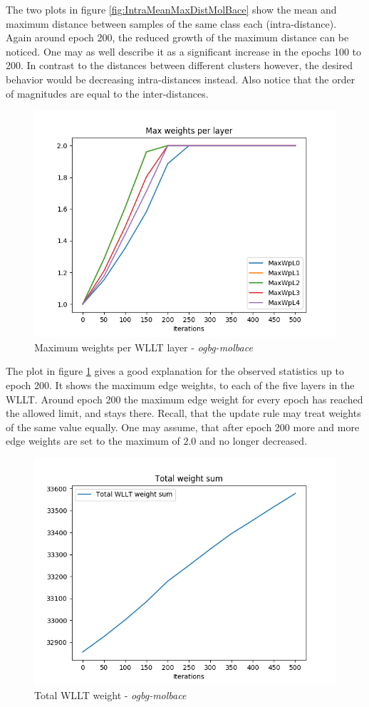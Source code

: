 		The two plots in figure \ref{fig:IntraMeanMaxDistMolBace} show the mean and maximum distance between samples of the same class each (intra-distance).
		Again around epoch 200, the reduced growth of the maximum distance can be noticed.
		One may as well describe it as a significant increase in the epochs 100 to 200.
		In contrast to the distances between different clusters however, the desired behavior would be decreasing intra-distances instead.
		Also notice that the order of magnitudes are equal to the inter-distances.
		
		\begin{figure}[H]
			\centering
			\includegraphics[width=0.7\linewidth]{images/plotA1_MaxWpL_ogbgMolbaceExp1}			
			\caption{Maximum weights per WLLT layer - \textit{ogbg-molbace}}
			\label{fig:plota1maxwplogbgmolbaceexp1}	
		\end{figure}
		
		The plot in figure \ref{fig:plota1maxwplogbgmolbaceexp1} gives a good explanation for the observed statistics up to epoch 200.
		It shows the maximum edge weights, to each of the five layers in the WLLT.
		Around epoch 200 the maximum edge weight for every epoch has reached the allowed limit, and stays there.
		Recall, that the update rule may treat weights of the same value equally.
		One may assume, that after epoch 200 more and more edge weights are set to the maximum of $2.0$ and no longer decreased.
		
		\begin{figure}[H]
			\centering
			\includegraphics[width=0.7\linewidth]{images/plotA1_TotalWeightSum_ogbgMolbaceExp1}
			\caption{Total WLLT weight - \textit{ogbg-molbace}}
			\label{fig:plota1totalweightsumogbgmolbaceexp1}
		\end{figure}			
		
